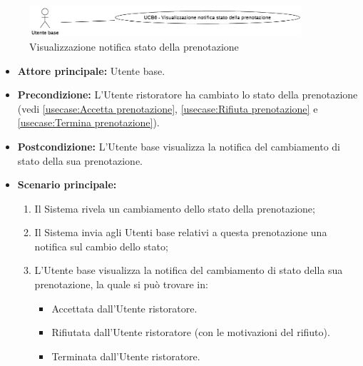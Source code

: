 \label{usecase:Visualizzazione notifica stato della prenotazione}

\begin{figure}[h]
	\centering
	\includegraphics[width=0.9\textwidth]{./uml/UCB6.png} 
	\caption{Visualizzazione notifica stato della prenotazione}
	\label{fig:UCB6}
  \end{figure}

\begin{itemize}
	\item \textbf{Attore principale:} Utente base.

	\item \textbf{Precondizione:} L'Utente ristoratore ha cambiato lo stato della prenotazione (vedi \autoref{usecase:Accetta prenotazione},
	      \autoref{usecase:Rifiuta prenotazione} e \autoref{usecase:Termina prenotazione}).


	\item \textbf{Postcondizione:} L'Utente base visualizza la notifica del cambiamento di stato della sua prenotazione.

	\item \textbf{Scenario principale:}
	      \begin{enumerate}
		      \item Il Sistema rivela un cambiamento dello stato della prenotazione;
		      \item Il Sistema invia agli Utenti base relativi a questa
		            prenotazione una notifica sul cambio dello stato;
		      \item L'Utente base visualizza la notifica del cambiamento di stato della sua prenotazione, la quale si può trovare in:
		            \begin{itemize}
			            \item Accettata dall'Utente ristoratore.
			            \item Rifiutata dall'Utente ristoratore (con le motivazioni del rifiuto).
			            \item Terminata dall'Utente ristoratore.
		            \end{itemize}
	      \end{enumerate}
\end{itemize}
